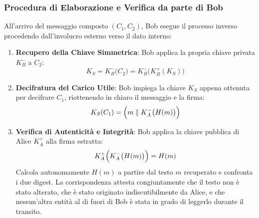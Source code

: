 \documentclass[11pt, a4paper]{article}
\begin{document}
\subsubsection{Procedura di Elaborazione e Verifica da parte di Bob}
All'arrivo del messaggio composto $(C_1, C_2)$, Bob esegue il processo inverso procedendo dall'involucro esterno verso il dato interno:
\begin{enumerate}[leftmargin=*]
    \item \textbf{Recupero della Chiave Simmetrica}: Bob applica la propria chiave privata $K_B^-$ a $C_2$:
    \[
    K_S = K_B^-\bigl(C_2\bigr) = K_B^-\bigl(K_B^+(K_S)\bigr)
    \]
    \item \textbf{Decifratura del Carico Utile}: Bob impiega la chiave $K_S$ appena ottenuta per decifrare $C_1$, riottenendo in chiaro il messaggio e la firma:
    \[
    K_S(C_1) = \Bigl(m \parallel K_A^-\bigl(H(m)\bigr)\Bigr)
    \]
    \item \textbf{Verifica di Autenticità e Integrità}: Bob applica la chiave pubblica di Alice $K_A^+$ alla firma estratta:
    \[
    K_A^+\Bigl(K_A^-\bigl(H(m)\bigr)\Bigr) = H(m)
    \]
    Calcola autonomamente $H(m)$ a partire dal testo $m$ recuperato e confronta i due digest. La corrispondenza attesta congiuntamente che il testo non è stato alterato, che è stato originato indiscutibilmente da Alice, e che nessun'altra entità al di fuori di Bob è stata in grado di leggerlo durante il transito.
\end{enumerate}
\end{document}
